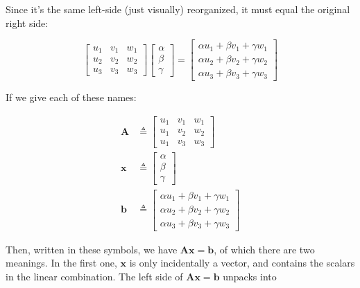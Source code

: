 \documentclass[main.tex]{subfiles}
\begin{document}
    Since it's the same left-side (just visually) reorganized, it must equal the original right side:

    $$\left[\begin{array}{lll}u_{1} & v_{1} & w_{1} \\ u_{2} & v_{2} & w_{2} \\ u_{3} & v_{3} & w_{3}\end{array}\right]\left[\begin{array}{l}\alpha \\ \beta \\ \gamma\end{array}\right]=\left[\begin{array}{l}\alpha u_{1}+\beta v_{1}+\gamma w_{1} \\ \alpha u_{2}+\beta v_{2}+\gamma w_{2} \\ \alpha u_{3}+\beta v_{3}+\gamma w_{3}\end{array}\right]$$
    
    If we give each of these names:
    
    $$\begin{aligned} \mathbf{A} & \triangleq\left[\begin{array}{lll}u_{1} & v_{1} & w_{1} \\ u_{1} & v_{2} & w_{2} \\ u_{1} & v_{3} & w_{3}\end{array}\right] \\ \mathbf{x} & \triangleq\left[\begin{array}{l}\alpha \\ \beta \\ \gamma\end{array}\right] \\ \mathbf{b} & \triangleq\left[\begin{array}{l}\alpha u_{1}+\beta v_{1}+\gamma w_{1} \\ \alpha u_{2}+\beta v_{2}+\gamma w_{2} \\ \alpha u_{3}+\beta v_{3}+\gamma w_{3}\end{array}\right] \end{aligned}$$
    
    Then, written in these symbols, we have $\mathbf{A x}=\mathbf{b}$, of which there are two meanings. In the first one, $\mathbf{x}$ is only incidentally a vector, and contains the scalars in the linear combination. The left side of $\mathbf{A} \mathbf{x}=\mathbf{b}$ unpacks into 
    
\end{document}
